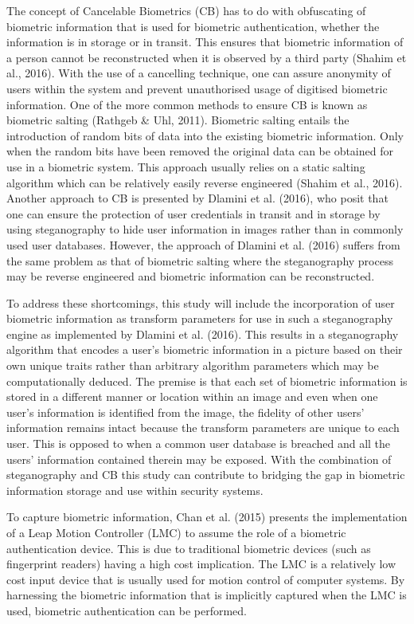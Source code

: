 The concept of Cancelable Biometrics (CB) has to do with obfuscating of biometric information that is used for biometric authentication, whether the information is in storage or in transit. This ensures that biometric information of a person cannot be reconstructed when it is observed by a third party (Shahim et al., 2016). With the use of a cancelling technique, one can assure anonymity of users within the system and prevent unauthorised usage of digitised biometric information. One of the more common methods to ensure CB is known as biometric salting (Rathgeb & Uhl, 2011). Biometric salting entails the introduction of random bits of data into the existing biometric information. Only when the random bits have been removed the original data can be obtained for use in a biometric system. This approach usually relies on a static salting algorithm which can be relatively easily reverse engineered (Shahim et al., 2016). Another approach to CB is presented by Dlamini et al. (2016), who posit that one can ensure the protection of user credentials in transit and in storage by using steganography to hide user information in images rather than in commonly used user databases. However, the approach of Dlamini et al. (2016) suffers from the same problem as that of biometric salting where the steganography process may be reverse engineered and biometric information can be reconstructed. 

To address these shortcomings, this study will include the incorporation of user biometric information as transform parameters for use in such a steganography engine as implemented by Dlamini et al. (2016). This results in a steganography algorithm that encodes a user’s biometric information in a picture based on their own unique traits rather than arbitrary algorithm parameters which may be computationally deduced. The premise is that each set of biometric information is stored in a different manner or location within an image and even when one user’s information is identified from the image, the fidelity of other users’ information remains intact because the transform parameters are unique to each user. This is opposed to when a common user database is breached and all the users’ information contained therein may be exposed. With the combination of steganography and CB this study can contribute to bridging the gap in biometric information storage and use within security systems.

To capture biometric information, Chan et al. (2015) presents the implementation of a Leap Motion Controller (LMC) to assume the role of a biometric authentication device. This is due to traditional biometric devices (such as fingerprint readers) having a high cost implication. The LMC is a relatively low cost input device that is usually used for motion control of computer systems. By harnessing the biometric information that is implicitly captured when the LMC is used, biometric authentication can be performed. 

